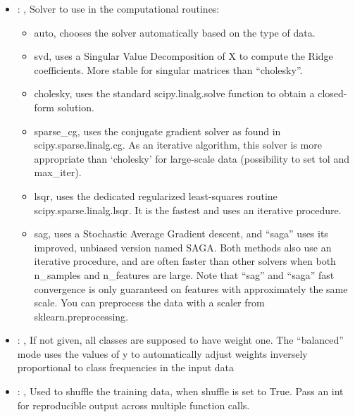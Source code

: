 \begin{itemize}
    \item {}: , 
      Solver to use in the computational routines:
      \begin{itemize}                                                    \item auto, chooses the
      solver automatically based on the type of data.
      \item svd, uses a Singular Value Decomposition of X to compute the Ridge coefficients. More
      stable for singular                                                                matrices
      than ``cholesky''.                                                    \item cholesky, uses the
      standard scipy.linalg.solve function to obtain a closed-form solution.
      \item sparse\_cg, uses the conjugate gradient solver as found in scipy.sparse.linalg.cg. As an
      iterative algorithm,                                                               this solver
      is more appropriate than ‘cholesky’ for large-scale data (possibility to set tol and
      max\_iter).                                                    \item lsqr, uses the dedicated
      regularized least-squares routine scipy.sparse.linalg.lsqr. It is the fastest and uses
      an iterative procedure.                                                    \item sag, uses a
      Stochastic Average Gradient descent, and ``saga'' uses its improved, unbiased version named
      SAGA.                                                               Both methods also use an
      iterative procedure, and are often faster than other solvers when both
      n\_samples and n\_features are large. Note that ``sag'' and ``saga'' fast convergence is only
      guaranteed on                                                               features with
      approximately the same scale. You can preprocess the data with a scaler from
      sklearn.preprocessing.                                                  \end{itemize}

    \item {}: \xmlDesc{[balanced]}, 
      If not given, all classes are supposed to have weight one.
      The “balanced” mode uses the values of y to automatically adjust weights
      inversely proportional to class frequencies in the input data

    \item {}: , 
      Used to shuffle the training data, when shuffle is set to
      True. Pass an int for reproducible output across multiple function calls.
  \end{itemize}
